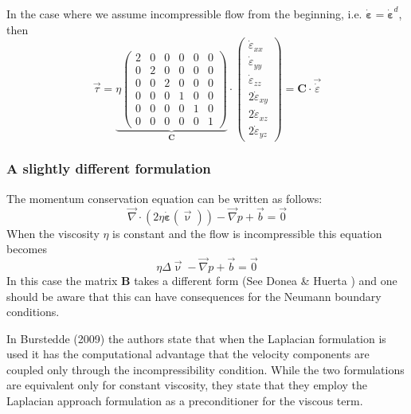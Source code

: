 In the case where we assume incompressible flow from the beginning, 
i.e. $\dot{\bm \varepsilon}=\dot{\bm \varepsilon}^d$, 
then 
\begin{equation}
\vec \tau  
=
\underbrace{
\eta
\left(
\begin{array}{cccccc}
2 & 0& 0& 0& 0& 0\\
0 & 2& 0& 0& 0& 0\\
0 & 0& 2& 0& 0& 0\\
0 &0 &0 & 1& 0& 0\\
0 &0 &0 & 0& 1& 0\\
0 &0 &0 & 0& 0& 1 
\end{array}
\right)
}_{\bm C}
\cdot
\left(
\begin{array}{c}
\dot\varepsilon_{xx} \\
\dot\varepsilon_{yy} \\
\dot\varepsilon_{zz} \\
2\dot\varepsilon_{xy} \\
2\dot\varepsilon_{xz} \\
2\dot\varepsilon_{yz} 
\end{array}
\right)
=
{\bm C} \cdot \vec{\dot \varepsilon}
\end{equation}

\subsubsection{A slightly different formulation}

The momentum conservation equation can be written as follows:
\[
\vec\nabla\cdot( 2 \eta \dot{\bm \varepsilon}(\vec\upnu)) - \vec\nabla p + \vec b = \vec 0
\]
When the viscosity $\eta$ is constant and the flow is incompressible this equation becomes
\[
\eta \Delta \vec \upnu - \vec\nabla p + \vec b = \vec 0
\]
In this case the matrix ${\bm B}$ takes a different form (See Donea \& Huerta \cite[Eq. 6.24]{dohu03})
and one should be aware that this can have consequences for the Neumann boundary conditions. 

In Burstedde \etal (2009) \cite{bugs09} the authors state that when the Laplacian formulation is used 
it has the computational advantage that the velocity
components are coupled only through the incompressibility condition. 
While the two formulations are equivalent only for constant viscosity, they state 
that they employ the Laplacian approach formulation as a preconditioner for the viscous term. 

